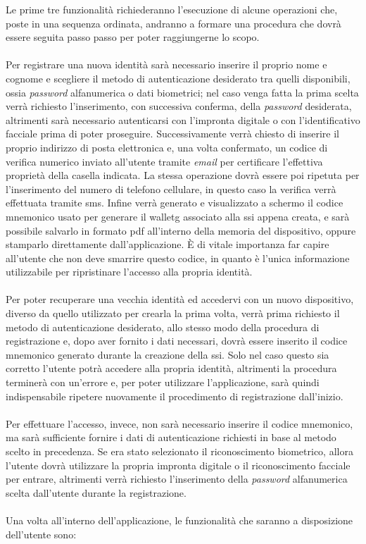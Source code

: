 Le prime tre funzionalità richiederanno l'esecuzione di alcune operazioni che, poste in una sequenza ordinata, andranno a formare una procedura che dovrà essere seguita passo passo per poter raggiungerne lo scopo.\\\\
Per registrare una nuova identità sarà necessario inserire il proprio nome e cognome e scegliere il metodo di autenticazione desiderato tra quelli disponibili, ossia \textit{password} alfanumerica o dati biometrici; nel caso venga fatta la prima scelta verrà richiesto l'inserimento, con successiva conferma, della \textit{password} desiderata, altrimenti sarà necessario autenticarsi con l'impronta digitale o con l'identificativo facciale prima di poter proseguire. Successivamente verrà chiesto di inserire il proprio indirizzo di posta elettronica e, una volta confermato, un codice di verifica numerico inviato all'utente tramite \textit{email} per certificare l'effettiva proprietà della casella indicata. La stessa operazione dovrà essere poi ripetuta per l'inserimento del numero di telefono cellulare, in questo caso la verifica verrà effettuata tramite \gls{sms}\glsfirstoccur. Infine verrà generato e visualizzato a schermo il codice mnemonico usato per generare il \gls{walletg} associato alla \gls{ssi} appena creata, e sarà possibile salvarlo in formato \gls{pdf}\glsfirstoccur{} all'interno della memoria del dispositivo, oppure stamparlo direttamente dall'applicazione. È di vitale importanza far capire all'utente che non deve smarrire questo codice, in quanto è l'unica informazione utilizzabile per ripristinare l'accesso alla propria identità.\\\\
Per poter recuperare una vecchia identità ed accedervi con un nuovo dispositivo, diverso da quello utilizzato per crearla la prima volta, verrà prima richiesto il metodo di autenticazione desiderato, allo stesso modo della procedura di registrazione e, dopo aver fornito i dati necessari, dovrà essere inserito il codice mnemonico generato durante la creazione della \gls{ssi}. Solo nel caso questo sia corretto l'utente potrà accedere alla propria identità, altrimenti la procedura terminerà con un'errore e, per poter utilizzare l'applicazione, sarà quindi indispensabile ripetere nuovamente il procedimento di registrazione dall'inizio.\\\\
Per effettuare l'accesso, invece, non sarà necessario inserire il codice mnemonico, ma sarà sufficiente fornire i dati di autenticazione richiesti in base al metodo scelto in precedenza. Se era stato selezionato il riconoscimento biometrico, allora l'utente dovrà utilizzare la propria impronta digitale o il riconoscimento facciale per entrare, altrimenti verrà richiesto l'inserimento della \textit{password} alfanumerica scelta dall'utente durante la registrazione.\\\\
Una volta all'interno dell'applicazione, le funzionalità che saranno a disposizione dell'utente sono:

